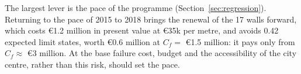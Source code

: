 The largest lever is the pace of the programme
(Section~\ref{sec:regression}). Returning to the pace of 2015 to 2018 brings the
renewal of the 17 walls forward, which costs \euro1.2 million in present value
at \euro35k per metre, and avoids 0.42 expected limit states, worth
\euro0.6 million at $C_f = $ \euro1.5 million: it pays only from $C_f \approx$
\euro3 million. At the base failure cost, budget and the accessibility of the city centre, rather than this risk, should set the pace.



